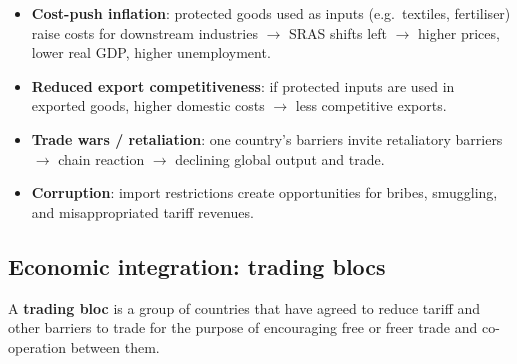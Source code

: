 \documentclass[a4paper,12pt]{article}
\begin{document}
\begin{itemize}
  \item \textbf{Cost-push inflation}: protected goods used as inputs (e.g.\ textiles, fertiliser) raise costs for downstream industries $\to$ SRAS shifts left $\to$ higher prices, lower real GDP, higher unemployment.
  \item \textbf{Reduced export competitiveness}: if protected inputs are used in exported goods, higher domestic costs $\to$ less competitive exports.
  \item \textbf{Trade wars / retaliation}: one country's barriers invite retaliatory barriers $\to$ chain reaction $\to$ declining global output and trade.
  \item \textbf{Corruption}: import restrictions create opportunities for bribes, smuggling, and misappropriated tariff revenues.
\end{itemize}
\subsection{Economic integration: trading blocs}
A \textbf{trading bloc} is a group of countries that have agreed to reduce tariff and other barriers to trade for the purpose of encouraging free or freer trade and co-operation between them.
\end{document}
